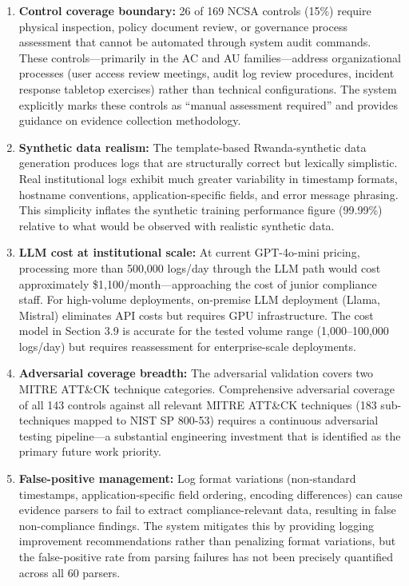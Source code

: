 \documentclass[12pt,oneside]{report}
\begin{document}
\begin{enumerate}
  \item \textbf{Control coverage boundary:} 26 of 169 NCSA controls (15\%) require physical inspection, policy document review, or governance process assessment that cannot be automated through system audit commands. These controls—primarily in the AC and AU families—address organizational processes (user access review meetings, audit log review procedures, incident response tabletop exercises) rather than technical configurations. The system explicitly marks these controls as ``manual assessment required'' and provides guidance on evidence collection methodology.

  \item \textbf{Synthetic data realism:} The template-based Rwanda-synthetic data generation produces logs that are structurally correct but lexically simplistic. Real institutional logs exhibit much greater variability in timestamp formats, hostname conventions, application-specific fields, and error message phrasing. This simplicity inflates the synthetic training performance figure (99.99\%) relative to what would be observed with realistic synthetic data.

  \item \textbf{LLM cost at institutional scale:} At current GPT-4o-mini pricing, processing more than 500,000 logs/day through the LLM path would cost approximately \$1,100/month—approaching the cost of junior compliance staff. For high-volume deployments, on-premise LLM deployment (Llama, Mistral) eliminates API costs but requires GPU infrastructure. The cost model in Section 3.9 is accurate for the tested volume range (1,000--100,000 logs/day) but requires reassessment for enterprise-scale deployments.

  \item \textbf{Adversarial coverage breadth:} The adversarial validation covers two MITRE ATT\&CK technique categories. Comprehensive adversarial coverage of all 143 controls against all relevant MITRE ATT\&CK techniques (183 sub-techniques mapped to NIST SP 800-53) requires a continuous adversarial testing pipeline—a substantial engineering investment that is identified as the primary future work priority.

  \item \textbf{False-positive management:} Log format variations (non-standard timestamps, application-specific field ordering, encoding differences) can cause evidence parsers to fail to extract compliance-relevant data, resulting in false non-compliance findings. The system mitigates this by providing logging improvement recommendations rather than penalizing format variations, but the false-positive rate from parsing failures has not been precisely quantified across all 60 parsers.
\end{enumerate}
\end{document}
